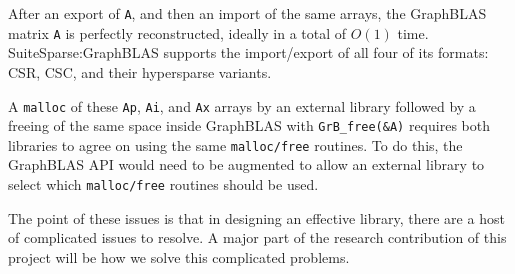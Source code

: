 After an export of \verb'A', and then an import of the same arrays, the
GraphBLAS matrix \verb'A' is perfectly reconstructed, ideally in a total of
$O(1)$ time.  SuiteSparse:GraphBLAS supports the import/export of all four of
its formats: CSR, CSC, and their hypersparse variants.

A \verb'malloc' of these \verb'Ap', \verb'Ai', and \verb'Ax' arrays by an
external library followed by a freeing of the same space inside GraphBLAS with
\verb'GrB_free(&A)' requires both libraries to agree on using the same
\verb'malloc/free' routines.  To do this, the GraphBLAS API would need to be
augmented to allow an external library to select which \verb'malloc/free'
routines should be used.

The point of these issues is that in designing an effective library, there are a host of 
complicated issues to resolve.  A major part of the research contribution of this project will
be how we solve this complicated problems.



